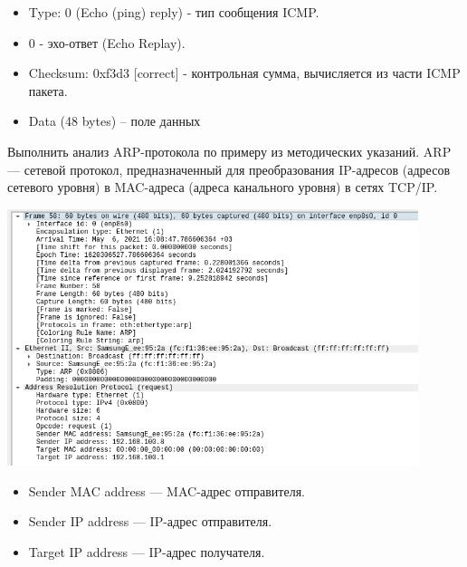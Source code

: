 \begin{itemize}
    \scriptsize
    \item Type: 0 (Echo (ping) reply) - тип сообщения ICMP.
    \item 0 - эхо-ответ (Echo Replay).
    \item Checksum: 0xf3d3 [correct] - контрольная сумма, вычисляется из части ICMP пакета.
    \item Data (48 bytes) – поле данных
\end{itemize}

Выполнить анализ ARP-протокола по примеру из методических указаний.
ARP — сетевой протокол, предназначенный для преобразования IP-адресов (адресов сетевого уровня) в MAC-адреса (адреса канального уровня) в сетях TCP/IP.

\includegraphics[width=0.9\textwidth]{resources/ARP}

\begin{itemize}
    \scriptsize
    \item Sender MAC address --- MAC-адрес отправителя.
    \item Sender IP address --- IP-адрес отправителя.
    \item Target IP address --- IP-адрес получателя.
\end{itemize}


